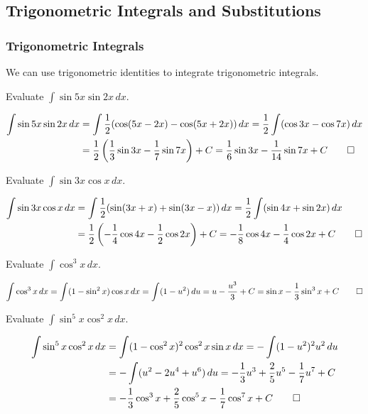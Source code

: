 \subsection{Trigonometric Integrals and Substitutions}
\subsubsection{Trigonometric Integrals}
We can use trigonometric identities to integrate trigonometric integrals.
\begin{problem}
    Evaluate \(\displaystyle{\int\sin 5x\sin 2x\,dx}\).
\end{problem}
\begin{solution}
    \begin{align*}
        \int\sin 5x\sin 2x\,dx &= \int\frac{1}{2}(\cos(5x-2x)-\cos(5x+2x))\,dx
        =\frac{1}{2}\int(\cos 3x-\cos 7x)\,dx \\
        &= \frac{1}{2}\left(\frac{1}{3}\sin 3x-\frac{1}{7}\sin 7x\right)+C
        =\frac{1}{6}\sin 3x-\frac{1}{14}\sin 7x+C \qedhere
    \end{align*}
\end{solution}
\begin{problem}
    Evaluate \(\displaystyle{\int\sin 3x\cos x\,dx}\).
\end{problem}
\begin{solution}
    \begin{align*}
        \int\sin 3x\cos x\,dx &= \int\frac{1}{2}(\sin(3x+x)+\sin(3x-x))\,dx
        =\frac{1}{2}\int(\sin 4x+\sin 2x)\,dx \\
        &= \frac{1}{2}\left(-\frac{1}{4}\cos 4x-\frac{1}{2}\cos 2x\right)+C
        =-\frac{1}{8}\cos 4x-\frac{1}{4}\cos 2x+C \qedhere
    \end{align*}
\end{solution}
\begin{problem}
    Evaluate \(\displaystyle{\int\cos^3 x\,dx}\).
\end{problem}
\begin{solution}
    \[\int\cos^3 x\,dx=\int(1-\sin^2 x)\cos x\,dx=\int(1-u^2)\,du
    =u-\frac{u^3}{3}+C=\sin x-\frac{1}{3}\sin^3 x+C\qedhere\]
\end{solution}
\begin{problem}
    Evaluate \(\displaystyle{\int\sin^5 x\cos^2 x\,dx}\).
\end{problem}
\begin{solution}
    \begin{align*}
        \int\sin^5 x\cos^2 x\,dx &= \int(1-\cos^2 x)^2\cos^2 x\sin x\,dx
        =-\int(1-u^2)^2u^2\,du \\
        &= -\int(u^2-2u^4+u^6)\,du
        =-\frac{1}{3}u^3+\frac{2}{5}u^5-\frac{1}{7}u^7+C \\
        &= -\frac{1}{3}\cos^3 x+\frac{2}{5}\cos^5 x-\frac{1}{7}\cos^7 x
        +C \qedhere
    \end{align*}
\end{solution}
